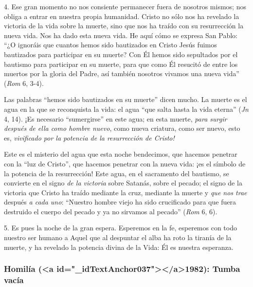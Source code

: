 			\begin{body}4. Ese gran momento no nos consiente permanecer fuera de nosotros mismos; nos obliga a entrar en nuestra propia humanidad. Cristo no sólo nos ha revelado la victoria de la vida sobre la muerte, sino que nos ha traído con su resurrección la nueva vida. Nos ha dado esta nueva vida. He aquí cómo se expresa San Pablo: “¿O ignoráis que cuantos hemos sido bautizados en Cristo Jesús fuimos bautizados para participar en su muerte? Con Él hemos sido sepultados por el bautismo para participar en su muerte, para que como Él resucitó de entre los muertos por la gloria del Padre, así también nosotros vivamos una nueva vida” (\textit{Rom} 6, 3-4).\end{body}
			
			\begin{body}Las palabras “hemos sido bautizados en su muerte” dicen mucho. La muerte es el agua en la que se reconquista la vida: el agua “que salta hasta la vida eterna” (\textit{Jn} 4, 14). ¡Es necesario “sumergirse” en este agua; en esta muerte, \textit{para surgir después de ella como hombre nuevo}, como nueva criatura, como ser nuevo, esto es, \textit{vivificado por la potencia de la resurrección de Cristo!}\end{body}
			
			\begin{body}Este es el misterio del agua que esta noche bendecimos, que hacemos penetrar con la “luz de Cristo”, que hacemos penetrar con la nueva vida: ¡es el símbolo de la potencia de la resurrección! Este agua, en el sacramento del bautismo, se convierte en el signo \textit{de la victoria} sobre Satanás, sobre el pecado; el signo de la victoria que Cristo ha traído mediante la cruz, mediante la muerte y \textit{que nos trae} después \textit{a cada uno}: “Nuestro hombre viejo ha sido crucificado para que fuera destruido el cuerpo del pecado y ya no sirvamos al pecado” (\textit{Rom} 6, 6).\end{body}
			
			\begin{body}5. Es pues la noche de la gran espera. Esperemos en la fe, esperemos con todo nuestro ser humano a Aquel que al despuntar el alba ha roto la tiranía de la muerte, y ha revelado la potencia divina de la Vida: Él es nuestra esperanza.\end{body}
			
			\subsubsection{Homilía (<a id="_idTextAnchor037"></a>1982): Tumba vacía}
			
